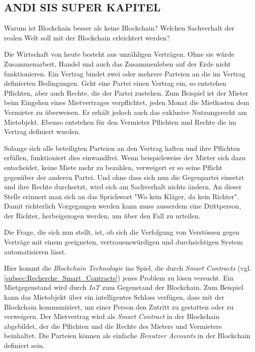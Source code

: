 \subsection{ANDI SIS SUPER KAPITEL}
Warum ist Blockchain besser als keine Blockchain? Welchen Sachverhalt der realen Welt soll mit der Blockchain erleichtert werden?

Die Wirtschaft von heute besteht aus unzähligen Verträgen. Ohne sie würde Zusammenarbeit, Handel und auch das Zusammenleben auf der Erde nicht funktionieren. Ein Vertrag bindet zwei oder mehrere Parteien an die im Vertrag definierten Bedingungen. Geht eine Partei einen Vertrag ein, so entstehen Pflichten, aber auch Rechte, die der Partei zustehen. Zum Beispiel ist der Mieter beim Eingehen eines Mietvertrages verpflichtet, jeden Monat die Mietkosten dem Vermieter zu überweisen. Er erhält jedoch auch das exklusive Nutzungsrecht am Mietobjekt. Ebenso entstehen für den Vermieter Pflichten und Rechte die im Vertrag definiert wurden.

Solange sich alle beteiligten Parteien an den Vertrag halten und ihre Pflichten erfüllen, funktioniert dies einwandfrei. Wenn beispielsweise der Mieter sich dazu entscheidet, keine Miete mehr zu bezahlen, verweigert er so seine Pflicht gegenüber der anderen Partei. Und ohne dass sich nun die Gegenpartei einsetzt und ihre Rechte durchsetzt, wird sich am Sachverhalt nichts ändern. An dieser Stelle erinnert man sich an das Sprichwort "Wo kein Kläger, da kein Richter". Damit richterlich Vorgegangen werden kann muss ausserdem eine Drittperson, der Richter, herbeigezogen werden, um über den Fall zu urteilen.

Die Frage, die sich nun stellt, ist, ob sich die Verfolgung von Verstössen gegen Verträge mit einem geeigneten, vertrauenswürdigen und durchsichtigen System automatisieren lässt.

Hier kommt die \emph{Blockchain Technologie} ins Spiel, die durch \emph{Smart Contracts} (vgl. \ref{subsec:Recherche_Smart_Contracts}) jenes Problem zu lösen versucht. Ein Mietgegenstand wird durch \emph{IoT} zum Gegenstand der Blockchain. Zum Beispiel kann das Mietobjekt über ein intelligentes Schloss verfügen, dass mit der Blockchain kommuniziert, um einer Person den Zutritt zu gestatten oder zu verweigern. Der Mietvertrag wird als \emph{Smart Contract} in der Blockchain abgebildet, der die Pflichten und die Rechte des Mieters und Vermieters beinhaltet. Die Parteien können als einfache \emph{Benutzer Accounts} in der Blockchain definiert sein.

